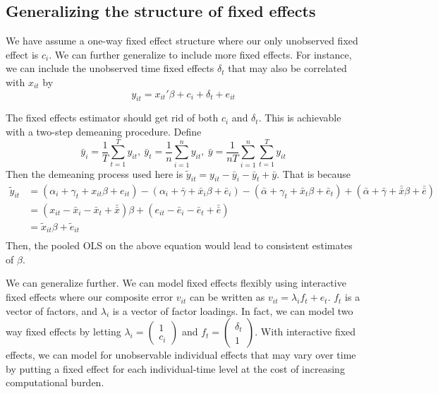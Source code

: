 \documentclass[12pt]{article}
\theoremstyle{definition}
\theoremstyle{property}
\theoremstyle{assumption}
\theoremstyle{example}
\theoremstyle{comment}
\begin{document}
\subsection{Generalizing the structure of fixed effects}
We have assume a one-way fixed effect structure where our only unobserved fixed effect is $c_i$. We can further generalize to include more fixed effects. For instance, we can include the unobserved time fixed effects $\delta_t$ that may also be correlated with $x_{it}$ by
\[
y_{it} = x_{it}'\beta+ c_i + \delta_t + e_{it}
\]
\par The fixed effects estimator should get rid of both $c_i$ and $\delta_t$. This is achievable with a two-step demeaning procedure. Define 
\[
\bar{y}_i = \frac{1}{T}\sum_{t=1}^T y_{it},\ \bar{y}_t = \frac{1}{n}\sum_{i=1}^n y_{it}, \ \bar{y}=\frac{1}{nT}\sum_{i=1}^n \sum_{t=1}^T y_{it}
\]
Then the demeaning process used here is $\tilde{y}_{it}=y_{it}-\bar{y}_i - \bar{y}_t + \bar{y}$. That is because
\[
\begin{aligned}
\tilde{y}_{it}&=(\alpha_i+\gamma_t+x_{it}\beta+e_{it})-(\alpha_i+\bar{\gamma}+\bar{x}_i\beta+\bar{e}_i)-(\bar{\alpha}+\gamma_t+\bar{x}_t\beta+\bar{e}_t)+(\bar{\alpha}+\bar{\gamma}+\bar{\bar{x}}\beta+\bar{\bar{e}})\\
&=(x_{it}-\bar{x}_i-\bar{x}_t+\bar{\bar{x}})\beta+(e_{it}-\bar{e}_i-\bar{e}_t+\bar{\bar{e}})\\
&=\tilde{x}_{it}\beta+\tilde{e}_{it}\\
\end{aligned}
\]
Then, the pooled OLS on the above equation would lead to consistent estimates of $\beta$.
\par
We can generalize further. We can model fixed effects flexibly using interactive fixed effects where our composite error $v_{it}$ can be written as $v_{it} = \lambda_i f_t  + e_t$. $f_t$ is a vector of factors, and $\lambda_i$ is a vector of factor loadings. In fact, we can model two way fixed effects by letting $\lambda_ i = \begin{pmatrix} 1 \\ c_i \end{pmatrix}$ and $f_t = \begin{pmatrix} \delta_t \\ 1 \end{pmatrix}$. With interactive fixed effects, we can model for unobservable individual effects that may vary over time by putting a fixed effect for each individual-time level at the cost of increasing computational burden. 
\end{document}
